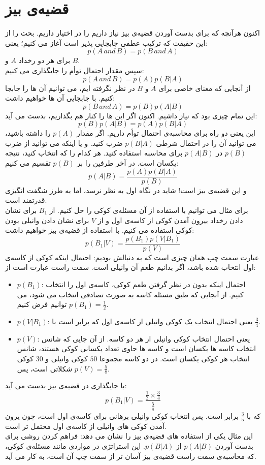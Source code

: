 \section{قضیه‌ی بیز}
اکنون هرآنچه که برای بدست آوردن قضیه‌ی بیز نیاز داریم را در اختیار داریم. بحث را از این حقیقت که ترکیب عطفی جابجایی پذیر است آغاز می کنیم؛ یعنی:
$$ p(A \,and\, B) = p(B \,and\, A)$$
برای هر دو رخداد $A$ و $B$.\\
سپس مقدار احتمال توأم را جایگذاری می کنیم:
$$ p(A \,and\, B) = p(A)p(B|A) $$
از آنجایی که معنای خاصی برای $A$ و $B$ در نظر نگرفته ایم، می توانیم آن ها را جابجا کنیم. با جابجایی آن ها خواهیم داشت:
$$ p(B \,and\, A) = p(B)p(A|B) $$
این تمام چیزی بود که نیاز داشیم. اکنون اگر این ها را کنار هم بگذاریم، بدست می آید:
$$ p(B)p(A|B) = p(A)p(B|A) $$
این یعنی دو راه برای محاسبه‌ی احتمال توأم داریم. اگر مقدار $p(A)$ را داشته باشید، می توانید آن را در احتمال شرطی $p(B|A)$ ضرب کنید. و یا اینکه می توانید از ضرب $p(B)$ در $p(A|B)$ برای محاسبه استفاده کنید. هر کدام را که انتخاب کنید، نتیجه یکسان است. در آخر طرفین را بر $p(B)$ تقسیم می کنیم:
$$ p(A|B) =  \frac{p(A)p(B|A)}{p(B)} $$
و این قضیه‌ی بیز است! شاید در نگاه اول به نظر نرسد، اما به طرز شگفت انگیزی قدرتمند است.\\
برای مثال می توانیم با استفاده از آن مسئله‌ی کوکی را حل کنیم. از $B_1$ برای نشان دادن رخداد بیرون آمدن کوکی از کاسه‌ی اول و از $V$ برای نشان دادن وانیلی بودن کوکی استفاده می کنیم. با استفاده از قضیه‌ی بیز خواهیم داشت:
$$  p(B_1|V) = \frac{p(B_1)p(V|B_1)}{p(V)} $$
عبارت سمت چپ همان چیزی است که به دنبالش بودیم: احتمال اینکه کوکی از کاسه‌ی اول انتخاب شده باشد، اگر بدانیم طعم آن وانیلی است. سمت راست عبارت است از:
\begin{itemize}
\item $p(B_1)$: احتمال اینکه بدون در نظر گرفتن طعم کوکی، کاسه‌ی اول را انتخاب کنیم. از آنجایی که طبق مسئله کاسه به صورت تصادفی انتخاب می شود، می توانیم فرض کنیم $p(B_1)=\frac{1}{2}$.
\item $p(V|B_1)$: یعنی احتمال انتخاب یک کوکی وانیلی از کاسه‌ی اول که برابر است با $\frac{3}{4}$.
\item $p(V)$: یعنی احتمال انتخاب کوکی وانیلی از هر دو کاسه. از آن جایی که شانس انتخاب کاسه ها یکسان است و کاسه ها حاوی تعداد یکسانی کوکی هستند، شانس انتخاب هر کوکی یکسان است. در دو کاسه مجموعا $50$ کوکی وانیلی و $30$ کوکی شکلاتی است، پس $p(V) = \frac{5}{8}$.
\end{itemize}
با جایگذاری در قضیه‌ی بیز بدست می آید:
$$ p(B_1|V) = \frac{\frac{1}{2}\times\frac{3}{4}}{\frac{5}{8}} $$
که با $\frac{3}{5}$ برابر است. پس انتخاب کوکی وانیلی برهانی  برای کاسه‌ی اول است، چون یرون آمدن کوکی های وانیلی از کاسه‌ی اول محتمل تر است.\\
این مثال یکی از استفاده های قضیه‌ی بیز را نشان می دهد: فراهم کردن روشی برای بدست آوردن $p(A|B)$ از $p(B|A)$. این استراتژی در مواردی مانند مسئله‌ی کوکی، که محاسبه‌‌ی سمت راست قضیه‌ی بیز آسان تر از سمت چپ آن است، به کار می آید.
